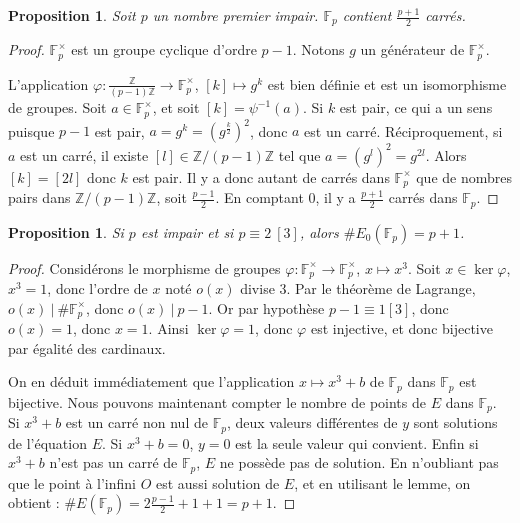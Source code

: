 \documentclass{article}
\theoremstyle{plain}%
\newtheorem{prop}[thm]{Proposition}
\theoremstyle{definition}%
\newcommand{\F}{\mathbb{F}}
\newcommand{\Z}{\mathbb{Z}}
\begin{document}
\begin{prop}
  Soit $p$ un nombre premier impair. $\F_{p}$ contient $\frac{p+1}{2}$ carrés.
\end{prop}

\begin{proof}
  $\F_{p}^\times$ est un groupe cyclique d'ordre $p-1$. 
  Notons $g$ un générateur de $\F_{p}^\times$. 
  
  L'application $ \varphi \colon \frac{\Z}{(p-1)\Z} \to \F_{p}^\times$,
  $[k] \mapsto g^k$
  est bien définie et est un isomorphisme de groupes.
  Soit $a\in \F_{p}^\times$, et soit $[k] = \psi^{-1}(a)$.
  Si $k$ est pair, ce qui a un sens puisque $p-1$ est pair, $a = g^k = (g^\frac{k}{2})^2$, donc $a$ est un carré.
  Réciproquement, si $a$ est un carré, il existe $[l]\in \Z/(p-1)\Z$ tel que $a = (g^l)^2 = g^{2l}$.
  Alors $[k] = [2l]$ donc $k$ est pair.
  Il y a donc autant de carrés dans $\F_{p}^\times$ que de nombres pairs dans $\Z/{(p-1)\Z}$, soit $\frac{p-1}{2}$. 
  En comptant $0$, il y a $\frac{p+1}{2}$ carrés dans $\F_{p}$. 
\end{proof}

\begin{prop}
  Si $p$ est impair et si $p \equiv 2\ [3]$, alors $\#E_0(\F_{p}) = p+1$.
\end{prop}

\begin{proof}
  Considérons le morphisme de groupes $\varphi \colon \F_{p}^\times \to \F_{p}^\times$, $x \mapsto x^3$. 
  Soit $x\in \ker \varphi$, $x^3 = 1$, donc l'ordre de $x$ noté $o(x)$ divise $3$. 
  Par le théorème de Lagrange, $o(x)\ |\ \#\F_{p}^\times$, donc $o(x)\ |\ p-1$. 
  Or par hypothèse $p-1\equiv 1[3]$, donc $o(x) = 1$, donc $x = 1$.
  Ainsi $\ker \varphi = {1}$, donc $\varphi$ est injective, et donc bijective par égalité des cardinaux.

  On en déduit immédiatement que l'application $x \mapsto x^3 + b$ de $\F_{p}$ dans $\F_{p}$ est bijective.
  Nous pouvons maintenant compter le nombre de points de $E$ dans $\F_{p}$. 
  Si $x^3 + b$ est un carré non nul de $\F_{p}$, deux valeurs différentes de $y$ sont solutions de l'équation $E$. 
  Si $x^3 + b = 0$, $y = 0$ est la seule valeur qui convient.
  Enfin si $x^3 + b$ n'est pas un carré de $\F_{p}$, $E$ ne possède pas de solution.
  En n'oubliant pas que le point à l'infini $O$ est aussi solution de $E$, et en utilisant le lemme, on obtient : $\#E(\F_{p}) = 2\frac{p-1}{2} + 1 + 1 = p+1$.
\end{proof}
\end{document}
